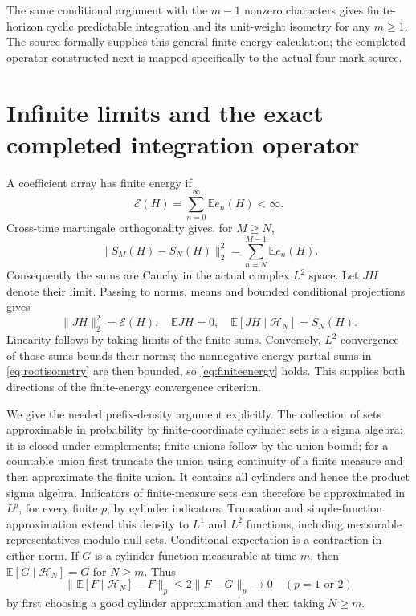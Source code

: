 \documentclass[11pt]{article}
\newcommand{\E}{\mathbb E}\newcommand{\Pp}{\mathbb P}
\begin{document}
The same conditional argument with the $m-1$ nonzero characters gives
finite-horizon cyclic predictable integration and its unit-weight
isometry for any $m\ge1$. The source formally supplies this general
finite-energy calculation; the completed operator constructed next is
mapped specifically to the actual four-mark source.

\section{Infinite limits and the exact completed integration operator}
A coefficient array has finite energy if
\begin{equation}\label{eq:finiteenergy}
 \mathcal E(H)=\sum_{n=0}^\infty\E e_n(H)<\infty.
\end{equation}
Cross-time martingale orthogonality gives, for $M\ge N$,
\[
 \|S_M(H)-S_N(H)\|_2^2=\sum_{n=N}^{M-1}\E e_n(H).
\]
Consequently the sums are Cauchy in the actual complex $L^2$ space.
Let $JH$ denote their limit. Passing to norms, means and bounded
conditional projections gives
\begin{equation}\label{eq:infiniteenergy}
 \|JH\|_2^2=\mathcal E(H),\quad \E JH=0,\quad
 \E[JH\mid\mathcal H_N]=S_N(H).
\end{equation}
Linearity follows by taking limits of the finite sums. Conversely,
$L^2$ convergence of those sums bounds their norms; the nonnegative
energy partial sums in \eqref{eq:rootisometry} are then bounded, so
\eqref{eq:finiteenergy} holds. This supplies both directions of the
finite-energy convergence criterion.

We give the needed prefix-density argument explicitly. The collection
of sets approximable in probability by finite-coordinate cylinder sets
is a sigma algebra: it is closed under complements; finite unions
follow by the union bound; for a countable union first truncate the
union using continuity of a finite measure and then approximate the
finite union. It contains all cylinders and hence the product sigma
algebra. Indicators of finite-measure sets can therefore be approximated
in $L^p$, for every finite $p$, by cylinder indicators. Truncation and
simple-function approximation extend this density to $L^1$ and $L^2$
functions, including measurable representatives modulo null sets.
Conditional expectation is a contraction in either norm. If $G$ is a
cylinder function measurable at time $m$, then
$\E[G\mid\mathcal H_N]=G$ for $N\ge m$. Thus
\[
 \|\E[F\mid\mathcal H_N]-F\|_p\le2\|F-G\|_p\longrightarrow0
 \quad(p=1\text{ or }2)
\]
by first choosing a good cylinder approximation and then taking $N\ge m$.
\end{document}
